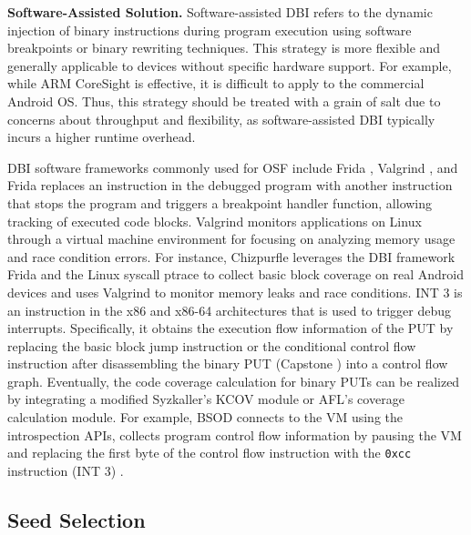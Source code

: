 \textbf{Software-Assisted Solution.}
Software-assisted DBI refers to the dynamic injection of binary instructions during program execution using software breakpoints or binary rewriting techniques. This strategy is more flexible and generally applicable to devices without specific hardware support. For example, while ARM CoreSight is effective, it is difficult to apply to the commercial Android OS. Thus, this strategy should be treated with a grain of salt due to concerns about throughput and flexibility, as software-assisted DBI typically incurs a higher runtime overhead.

DBI software frameworks commonly used for OSF include Frida \cite{frida2017}, Valgrind \cite{Valgrind2007} , and  Frida replaces an instruction in the debugged program with another instruction that stops the program and triggers a breakpoint handler function, allowing tracking of executed code blocks. Valgrind monitors applications on Linux through a virtual machine environment for focusing on analyzing memory usage and race condition errors. For instance, Chizpurfle \cite{Chizpurfle2019} leverages the DBI framework Frida and the Linux syscall ptrace to collect basic block coverage on real Android devices and uses Valgrind to monitor memory leaks and race conditions. INT 3 is an instruction in the x86 and x86-64 architectures that is used to trigger debug interrupts. Specifically, it obtains the execution flow information of the PUT by replacing the basic block jump instruction or the conditional control flow instruction after disassembling the binary PUT (\eg Capstone \cite{Capstone}) into a control flow graph. Eventually, the code coverage calculation for binary PUTs can be realized by integrating a modified Syzkaller's KCOV module or AFL's coverage calculation module. For example, BSOD \cite{maier2021bsod} connects to the VM using the introspection APIs, collects program control flow information by pausing the VM and replacing the first byte of the control flow instruction with the \texttt{0xcc} instruction (INT 3) .

\subsection{Seed Selection}
\label{Section4.3}


